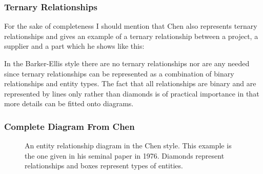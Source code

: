  


\subsubsection*{Ternary Relationships}
For the sake of completeness I should mention that Chen also represents ternary relationships and gives an 
example of a ternary relationship between a project, a supplier and a part which he shows like this:
\begin{center}

\end{center}

In the Barker-Ellis style there are no ternary relationships nor are any needed since ternary relationships can be represented as a combination of binary relationships and entity types. The fact that all relationships are binary and are represented by lines only rather than diamonds  is of practical importance in that more details can be fitted onto diagrams.

\subsubsection*{Complete Diagram From Chen}
\begin{figure}
\begin{center}

\end{center}
\caption{
An entity relationship diagram in the Chen style. This example is the one given in his seminal paper in 1976.
Diamonds represent relationships and boxes represent types of entities.
}
\end{figure}